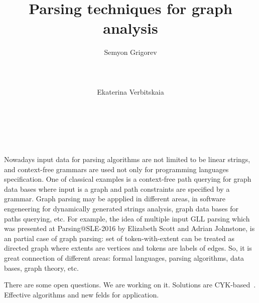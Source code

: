 \documentclass{vldb}
\begin{document}
\makeatletter
\def\@copyrightspace{\relax}
\makeatother


\title{Parsing techniques for graph analysis}



\author{
\alignauthor
       Semyon Grigorev\\
       \\
       \\
       \\
\alignauthor
       Ekaterina Verbitskaia\\
       \\
       \\
       \\
}


\maketitle

Nowadays input data for parsing algorithms are not limited to be linear strings, and context-free grammars are used not only for programming languages specification.
One of classical examples is a context-free path querying for graph data bases where input is a graph and path constraints are specified by a grammar.
Graph parsing may be appplied in different areas, in software engeneering for dynamically generated strings analysis, graph data bases for paths querying, etc.
For example, the idea of multiple input GLL parsing which was presented at Parsing@SLE-2016 by Elizabeth Scott and Adrian Johnstone, is an partial case of graph parsing: 
set of token-with-extent can be treated as directed graph where extents are vertices and tokens are labels of edges.
So, it is great connection of different areas: formal languages, parsing algorithms, data bases, graph theory, etc.

There are some open questions.
We are working on it.
Solutions are CYK-based~\cite{...}.
Effective algorithms and new felds for application.
\end{document}
